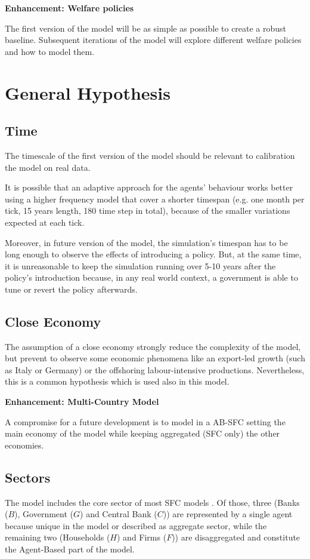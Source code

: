\documentclass[a4paper, headings=standardclasses]{scrartcl}
\newenvironment{enh}[1][]{\begin{framed}\noindent\textbf{Enhancement: #1}\par}{\end{framed}}
\begin{document}
\begin{enh}[Welfare policies]
	The first version of the model will be as simple as possible to create a robust baseline.
	Subsequent iterations of the model will explore different welfare policies and how to model them.
\end{enh}

\section{General Hypothesis}
\subsection{Time}
The timescale of the first version of the model should be relevant to calibration the model on real data.

It is possible that an adaptive approach for the agents' behaviour works better using a higher frequency model that cover a shorter timespan (e.g. one month per tick, 15 years length, 180 time step in total), because of the smaller variations expected at each tick.

Moreover, in future version of the model, the simulation's timespan has to be long enough to observe the effects of introducing a policy. But, at the same time, it is unreasonable to keep the simulation running over 5-10 years after the policy's introduction because, in any real world context, a government is able to tune or revert the policy afterwards.

\subsection{Close Economy}
The assumption of a close economy strongly reduce the complexity of the model, but prevent to observe some economic phenomena like an export-led growth (such as Italy or Germany) or the offshoring labour-intensive productions.
Nevertheless, this is a common hypothesis which is used also in this model.

\begin{enh}[Multi-Country Model]
	A compromise for a future development is to model in a AB-SFC setting the main economy of the model while keeping aggregated (SFC only) the other economies.
\end{enh}

\subsection{Sectors}
The model includes the core sector of most SFC models \parencite{nikiforos2017}. Of those, three (Banks ($B$), Government ($G$) and Central Bank ($C$)) are represented by a single agent because unique in the model or described as aggregate sector, while the remaining two (Households ($H$) and Firms ($F$)) are disaggregated and constitute the Agent-Based part of the model.
\end{document}

